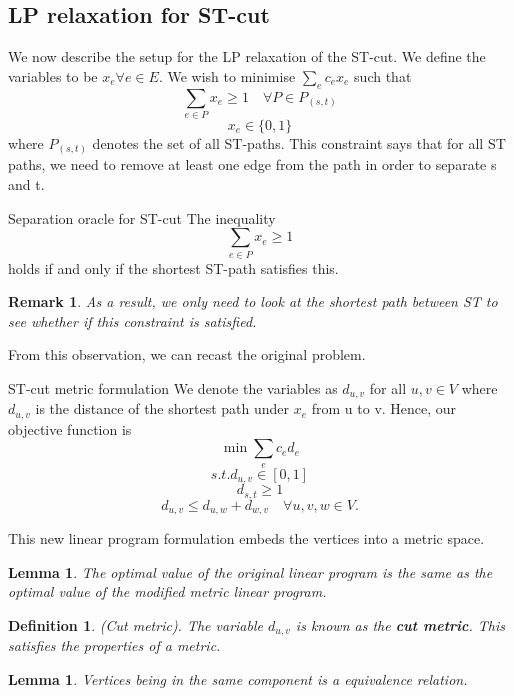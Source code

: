 \documentclass[twoside]{article}
\newtheorem{lemma}[theorem]{Lemma}
\newtheorem{definition}[theorem]{Definition}
\newtheorem{remark}[theorem]{Remark}
\begin{document}
\subsection{LP relaxation for ST-cut}
We now describe the setup for the LP relaxation of the ST-cut. We define the variables to be $x_e \forall e \in E$. We wish to minimise $\sum_{e}c_ex_e$ such that 
$$
\sum_{e \in P}x_e \geq 1 \quad \forall P \in P_{(s,t)}
$$
$$
x_e \in \{0, 1\}
$$
where $P_{(s,t)}$ denotes the set of all ST-paths. This constraint says that for all ST paths, we need to remove at least one edge from the path in order to separate s and t.

\begin{theorem_exam}{Separation oracle for ST-cut}{} The inequality 
$$
\sum_{e \in P}x_e \geq 1
$$
holds if and only if the shortest ST-path satisfies this.
\end{theorem_exam}

\begin{remark}As a result, we only need to look at the shortest path between ST to see whether if this constraint is satisfied.
\end{remark}

From this observation, we can recast the original problem.

\begin{theorem_exam}{ST-cut metric formulation}{} We denote the variables as $d_{u,v}$ for all $u, v \in V$ where $d_{u,v}$ is the distance of the shortest path under $x_e$ from u to v. Hence, our objective function is 
$$
\min \sum_{e}c_ed_e
$$
$$
s.t. d_{u,v} \in [0,1]
$$
$$
d_{s,t} \geq 1
$$
$$
d_{u,v} \leq d_{u,w} + d_{w,v} \quad \forall u,v,w \in V.
$$
\end{theorem_exam}

This new linear program formulation embeds the vertices into a metric space.
\begin{lemma}The optimal value of the original linear program is the same as the optimal value of the modified metric linear program.
\end{lemma}

\begin{definition}(Cut metric). The variable $d_{u,v}$ is known as the \textbf{cut metric}. This satisfies the properties of a metric.
\end{definition}

\begin{lemma}Vertices being in the same component is a equivalence relation.
\end{lemma}
\end{document}
